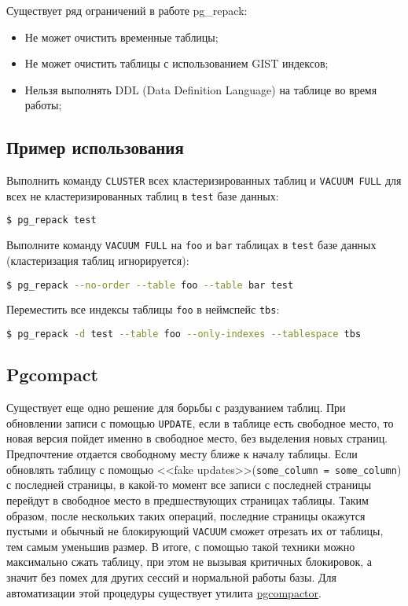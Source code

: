 Существует ряд ограничений в работе pg\_repack:

\begin{itemize}
  \item Не может очистить временные таблицы;
  \item Не может очистить таблицы с использованием GIST индексов;
  \item Нельзя выполнять DDL (Data Definition Language) на таблице во время работы;
\end{itemize}


\subsection{Пример использования}

Выполнить команду \lstinline!CLUSTER! всех кластеризированных таблиц и \lstinline!VACUUM FULL! для всех не кластеризированных таблиц в \lstinline!test! базе данных:

\begin{lstlisting}[language=Bash,label=lst:pgrepack1]
$ pg_repack test
\end{lstlisting}

Выполните команду \lstinline!VACUUM FULL! на \lstinline!foo! и \lstinline!bar! таблицах в \lstinline!test! базе данных (кластеризация таблиц игнорируется):

\begin{lstlisting}[language=Bash,label=lst:pgrepack2]
$ pg_repack --no-order --table foo --table bar test
\end{lstlisting}

Переместить все индексы таблицы \lstinline!foo! в неймспейс \lstinline!tbs!:

\begin{lstlisting}[language=Bash,label=lst:pgrepack3]
$ pg_repack -d test --table foo --only-indexes --tablespace tbs
\end{lstlisting}


\subsection{Pgcompact}

Существует еще одно решение для борьбы с раздуванием таблиц. При обновлении записи с помощью \lstinline!UPDATE!, если в таблице есть свободное место, то новая версия пойдет именно в свободное место, без выделения новых страниц. Предпочтение отдается свободному месту ближе к началу таблицы. Если обновлять таблицу с помощью <<fake updates>>(\lstinline!some_column = some_column!) с последней страницы, в какой-то момент все записи с последней страницы перейдут в свободное место в предшествующих страницах таблицы. Таким образом, после нескольких таких операций, последние страницы окажутся пустыми и обычный не блокирующий \lstinline!VACUUM! сможет отрезать их от таблицы, тем самым уменьшив размер. В итоге, с помощью такой техники можно максимально сжать таблицу, при этом не вызывая критичных блокировок, а значит без помех для других сессий и нормальной работы базы. Для автоматизации этой процедуры существует утилита \href{https://github.com/grayhemp/pgtoolkit}{pgcompactor}.

